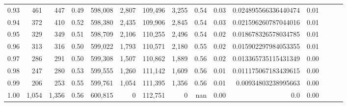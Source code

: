 \begin{tabular}{rrrrrrrrrrrrrrr}
0.93 &     461 &    447 &  0.49 &  598,008 &    2,807 &  109,496 &    3,255 &  0.54 &  0.03 &  0.024895566336440474 &      0.01 \\
0.94 &     372 &    410 &  0.52 &  598,380 &    2,435 &  109,906 &    2,845 &  0.54 &  0.03 &  0.021596260787044016 &      0.01 \\
0.95 &     329 &    349 &  0.51 &  598,709 &    2,106 &  110,255 &    2,496 &  0.54 &  0.02 &  0.018678326578034785 &      0.01 \\
0.96 &     313 &    316 &  0.50 &  599,022 &    1,793 &  110,571 &    2,180 &  0.55 &  0.02 &  0.015902297984053355 &      0.01 \\
0.97 &     286 &    291 &  0.50 &  599,308 &    1,507 &  110,862 &    1,889 &  0.56 &  0.02 &  0.013365735115431349 &      0.00 \\
0.98 &     247 &    280 &  0.53 &  599,555 &    1,260 &  111,142 &    1,609 &  0.56 &  0.01 &  0.011175067183439615 &      0.00 \\
0.99 &     206 &    253 &  0.55 &  599,761 &    1,054 &  111,395 &    1,356 &  0.56 &  0.01 &   0.00934803238995663 &      0.00 \\
1.00 &   1,054 &  1,356 &  0.56 &  600,815 &        0 &  112,751 &        0 &   nan &  0.00 &                   0.0 &      0.00 \\
\bottomrule
\end{tabular}

